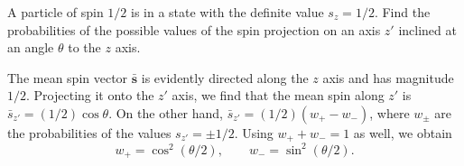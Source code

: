 



\ProblemHeading

A particle of spin $1/2$ is in a state with the definite value $s_z=1/2$.
Find the probabilities of the possible values of the spin projection on an
axis $z'$ inclined at an angle $\theta$ to the $z$ axis.

\SolutionHeading

The mean spin vector $\bar{\mathbf s}$ is evidently directed along the $z$
axis and has magnitude $1/2$. Projecting it onto the $z'$ axis, we find that
the mean spin along $z'$ is $\bar s_{z'}=(1/2)\cos\theta$. On the other hand,
$\bar s_{z'}=(1/2)(w_+-w_-)$, where $w_\pm$ are the probabilities of the
values $s_{z'}=\pm1/2$. Using $w_++w_-=1$ as well, we obtain
\[
 w_+=\cos^2(\theta/2),\qquad w_-=\sin^2(\theta/2).
\]
